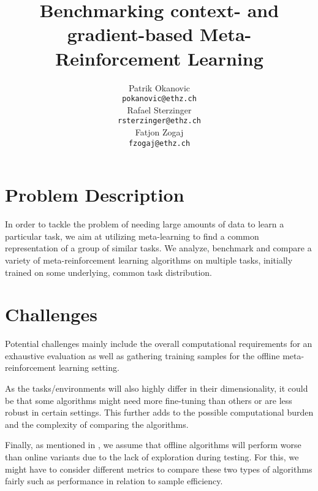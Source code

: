 \documentclass{article}
\title{Benchmarking context- and gradient-based Meta-Reinforcement Learning}
\author{
    Patrik Okanovic \\
    \texttt{pokanovic@ethz.ch} \\
    \And
    Rafael Sterzinger \\
    \texttt{rsterzinger@ethz.ch} \\
    \AND
    Fatjon Zogaj \\
    \texttt{fzogaj@ethz.ch} \\
}
\begin{document}
\maketitle

\section{Problem Description}
In order to tackle the problem of needing large amounts of data to learn a particular task, we aim at utilizing meta-learning to find a common representation of a group of similar tasks. We analyze, benchmark and compare a variety of meta-reinforcement learning algorithms on multiple tasks, initially trained on some underlying, common task distribution.

\section{Challenges}
Potential challenges mainly include the overall computational requirements for an exhaustive evaluation as well as gathering training samples for the offline meta-reinforcement learning setting.

As the tasks/environments will also highly differ in their dimensionality, it could be that some algorithms might need more fine-tuning than others or are less robust in certain settings. This further adds to the possible computational burden and the complexity of comparing the algorithms.

Finally, as mentioned in \cite{mitchell_offline_nodate}, we assume that offline algorithms will perform worse than online variants due to the lack of exploration during testing. 
For this, we might have to consider different metrics to compare these two types of algorithms fairly such as performance in relation to sample efficiency.
\end{document}
